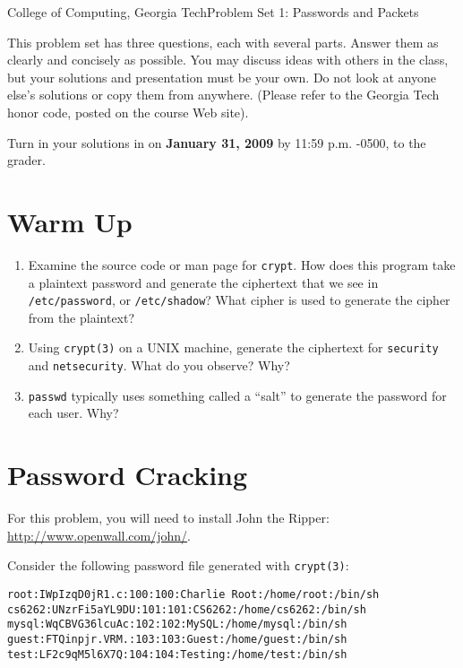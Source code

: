 \documentclass[11pt]{article}
\begin{document}


{College of Computing, Georgia Tech}{Problem Set 1: Passwords and Packets}

This problem set has three questions, each with several parts.  Answer
them as clearly and concisely as possible.  You may discuss ideas with
others in the class, but your solutions and presentation must be your
own.  Do not look at anyone else's solutions or copy them from
anywhere. (Please refer to the Georgia Tech honor code, posted on the
course Web site).

Turn in your solutions in on {\bf January 31, 2009} by 11:59 p.m. -0500,
to the grader.

\section{Warm Up}

\begin{enumerate}
\item Examine the source code or man page for {\tt crypt}.  How does
  this program take a plaintext password and generate the ciphertext
  that we see in {\tt /etc/password}, or {\tt /etc/shadow}?  What cipher
  is used to generate the cipher from the plaintext?
%
\item Using {\tt crypt(3)} on a UNIX machine, generate the
  ciphertext for {\tt security} and {\tt netsecurity}.  What do you
  observe?  Why?
\item {\tt passwd} typically uses something called a ``salt'' to
  generate the password for each user.  Why?
\end{enumerate}

\section{Password Cracking}

For this problem, you will need to install John the Ripper:
\url{http://www.openwall.com/john/}. 

Consider the following password file generated with {\tt crypt(3)}:

\begin{verbatim}
root:IWpIzqD0jR1.c:100:100:Charlie Root:/home/root:/bin/sh
cs6262:UNzrFi5aYL9DU:101:101:CS6262:/home/cs6262:/bin/sh
mysql:WqCBVG36lcuAc:102:102:MySQL:/home/mysql:/bin/sh
guest:FTQinpjr.VRM.:103:103:Guest:/home/guest:/bin/sh
test:LF2c9qM5l6X7Q:104:104:Testing:/home/test:/bin/sh
\end{verbatim}
\end{document}
